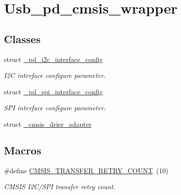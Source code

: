 \hypertarget{group__usb__pd__cmsis__wrapper}{\section{Usb\-\_\-pd\-\_\-cmsis\-\_\-wrapper}
\label{group__usb__pd__cmsis__wrapper}
}
\subsection*{Classes}
\begin{DoxyCompactItemize}
\item 
struct \hyperlink{struct__pd__i2c__interface__config}{\-\_\-pd\-\_\-i2c\-\_\-interface\-\_\-config}
\begin{DoxyCompactList}\small\item\em I2\-C interface configure parameter. \end{DoxyCompactList}\item 
struct \hyperlink{struct__pd__spi__interface__config}{\-\_\-pd\-\_\-spi\-\_\-interface\-\_\-config}
\begin{DoxyCompactList}\small\item\em S\-P\-I interface configure parameter. \end{DoxyCompactList}\item 
struct \hyperlink{struct__cmsis__drier__adapter}{\-\_\-cmsis\-\_\-drier\-\_\-adapter}
\end{DoxyCompactItemize}
\subsection*{Macros}
\begin{DoxyCompactItemize}
\item 
\#define \hyperlink{group__usb__pd__cmsis__wrapper_ga38c9923b4a5ea65a306222e1250ee94a}{C\-M\-S\-I\-S\-\_\-\-T\-R\-A\-N\-S\-F\-E\-R\-\_\-\-R\-E\-T\-R\-Y\-\_\-\-C\-O\-U\-N\-T}~(10)
\begin{DoxyCompactList}\small\item\em C\-M\-S\-I\-S I2\-C/\-S\-P\-I transfer retry count. \end{DoxyCompactList}\end{DoxyCompactItemize}
